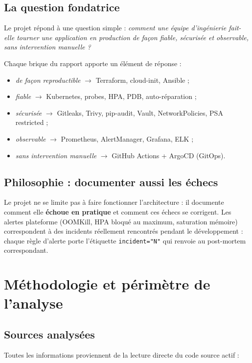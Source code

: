 \documentclass[12pt,a4paper,twoside,openright]{report}
\begin{document}
\subsection{La question fondatrice}
Le projet répond à une question simple : \emph{comment une équipe d'ingénierie fait-elle tourner une application en production de façon fiable, sécurisée et observable, sans intervention manuelle ?}

Chaque brique du rapport apporte un élément de réponse :
\begin{itemize}[itemsep=1pt]
  \item \emph{de façon reproductible} $\rightarrow$ Terraform, cloud-init, Ansible ;
  \item \emph{fiable} $\rightarrow$ Kubernetes, probes, HPA, PDB, auto-réparation ;
  \item \emph{sécurisée} $\rightarrow$ Gitleaks, Trivy, pip-audit, Vault, NetworkPolicies, PSA restricted ;
  \item \emph{observable} $\rightarrow$ Prometheus, AlertManager, Grafana, ELK ;
  \item \emph{sans intervention manuelle} $\rightarrow$ GitHub Actions + ArgoCD (GitOps).
\end{itemize}

\subsection{Philosophie : documenter aussi les échecs}
Le projet ne se limite pas à faire fonctionner l'architecture : il documente comment elle \textbf{échoue en pratique} et comment ces échecs se corrigent. Les alertes plateforme (OOMKill, HPA bloqué au maximum, saturation mémoire) correspondent à des incidents réellement rencontrés pendant le développement : chaque règle d'alerte porte l'étiquette \texttt{incident="N"} qui renvoie au post-mortem correspondant.

\section{Méthodologie et périmètre de l'analyse}

\subsection{Sources analysées}
Toutes les informations proviennent de la lecture directe du code source actif :
\end{document}
